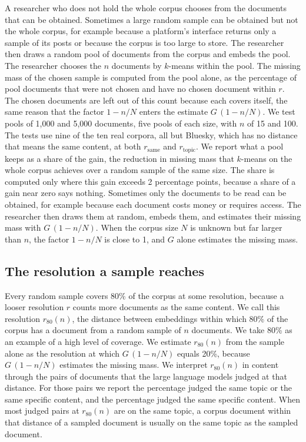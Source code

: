 A researcher who does not hold the whole corpus chooses from the documents that can be obtained. Sometimes a large random sample can be obtained but not the whole corpus, for example because a platform's interface returns only a sample of its posts or because the corpus is too large to store. The researcher then draws a random pool of documents from the corpus and embeds the pool. The researcher chooses the $n$ documents by $k$-means within the pool. The missing mass of the chosen sample is computed from the pool alone, as the percentage of pool documents that were not chosen and have no chosen document within $r$. The chosen documents are left out of this count because each covers itself, the same reason that the factor $1 - n/N$ enters the estimate $G\,(1 - n/N)$. We test pools of 1{,}000 and 5{,}000 documents, five pools of each size, with $n$ of 15 and 100. The tests use nine of the ten real corpora, all but Bluesky, which has no distance that means the same content, at both $r_{\mathrm{same}}$ and $r_{\mathrm{topic}}$. We report what a pool keeps as a share of the gain, the reduction in missing mass that $k$-means on the whole corpus achieves over a random sample of the same size. The share is computed only where this gain exceeds 2 percentage points, because a share of a gain near zero says nothing. Sometimes only the documents to be read can be obtained, for example because each document costs money or requires access. The researcher then draws them at random, embeds them, and estimates their missing mass with $G\,(1 - n/N)$. When the corpus size $N$ is unknown but far larger than $n$, the factor $1 - n/N$ is close to 1, and $G$ alone estimates the missing mass.

\subsection{The resolution a sample reaches}
\label{sec:resolution}

Every random sample covers 80\% of the corpus at some resolution, because a looser resolution $r$ counts more documents as the same content. We call this resolution $r_{80}(n)$, the distance between embeddings within which 80\% of the corpus has a document from a random sample of $n$ documents. We take 80\% as an example of a high level of coverage. We estimate $r_{80}(n)$ from the sample alone as the resolution at which $G\,(1 - n/N)$ equals 20\%, because $G\,(1 - n/N)$ estimates the missing mass. We interpret $r_{80}(n)$ in content through the pairs of documents that the large language models judged at that distance. For those pairs we report the percentage judged the same topic or the same specific content, and the percentage judged the same specific content. When most judged pairs at $r_{80}(n)$ are on the same topic, a corpus document within that distance of a sampled document is usually on the same topic as the sampled document.
